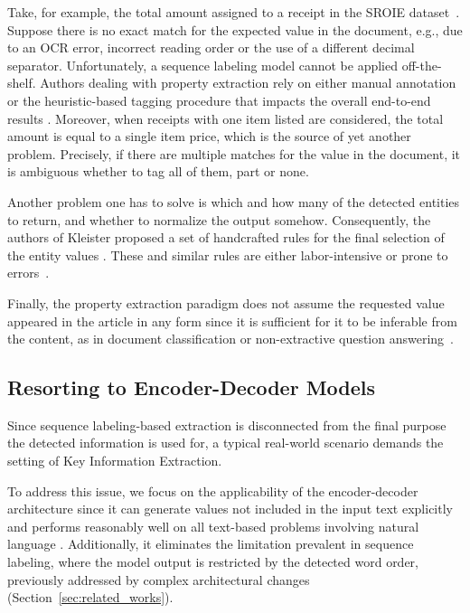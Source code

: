 \documentclass[runningheads]{llncs}
\begin{document}
Take, for example, the total amount assigned to a receipt in the SROIE dataset~\cite{Huang2019ICDAR2019CO}. Suppose there is no exact match for the expected value in the document, e.g., due to an OCR error, incorrect reading order or the use of a different decimal separator. Unfortunately, a sequence labeling model cannot be applied off-the-shelf. Authors dealing with property extraction rely on either manual annotation or the heuristic-based tagging procedure that impacts the overall end-to-end results \cite{xu2020layoutlm,gralinski2020kleister,garncarek2020lambert,hong2021bros,xu2020layoutlmv2,liu2019graph}. Moreover, when receipts with one item listed are considered, the total amount is equal to a single item price, which is the source of yet another problem. Precisely, if there are multiple matches for the value in the document, it is ambiguous whether to tag all of them, part or none.


Another problem one has to solve is which and how many of the detected entities to return, and whether to normalize the output somehow. Consequently, the authors of Kleister proposed a set of handcrafted rules for the final selection of the entity values \cite{gralinski2020kleister}.
These and similar rules are either labor-intensive or prone to errors~\cite{8270005}.

Finally, the property extraction paradigm does not assume the requested value appeared in the article in any form since it is sufficient for it to be inferable from the content, as in document classification or non-extractive question answering~\cite{dwojak-etal-2020-dataset}. 

\subsection{Resorting to Encoder-Decoder Models}






Since sequence labeling-based extraction is disconnected from the final purpose the detected information is used for, a typical real-world scenario demands the setting of Key Information Extraction.

To address this issue, we focus on the applicability of the encoder-decoder architecture since it can generate values not included in the input text explicitly \cite{hewlett-etal-2016-wikireading} and performs reasonably well on all text-based problems involving natural language \cite{2020t5}. Additionally, it eliminates the limitation prevalent in sequence labeling, where the model output is restricted by the detected word order, previously addressed by complex architectural changes (Section~\ref{sec:related_works}).
\end{document}
